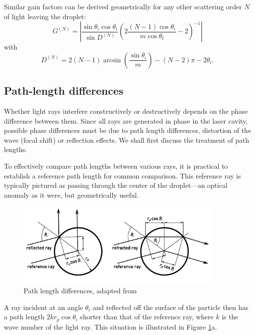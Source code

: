 \documentclass[11.5pt,oneside]{book}
\begin{document}
Similar gain factors can be derived geometrically for any other scattering order $N$ of light
leaving the droplet:
\begin{equation}
    \label{eq:gainfactor}
    G^{(N)} = \left| \frac{\sin \theta_i \cos \theta_i}{\sin D^{(N)}} \left(2
    \frac{(N-1)\cos \theta_i}{m \cos \theta_t} - 2\right)^{-1} \right|
\end{equation}
with
\begin{equation}
    D^{(N)} = 2(N-1) \arcsin \left(\frac{\sin \theta_i}{m}\right) - (N-2)\pi -
    2\theta_i.
\end{equation}

\subsection{Path-length differences}
Whether light rays interfere constructively or destructively depends on the
phase difference between them. Since all rays are generated in phase in the
laser cavity, possible phase differences must be due to path length differences,
distortion of the wave (focal shift) or reflection effects. We shall first
discuss the treatment of path lengths.

To effectively compare path lengths between various rays, it is practical to
establish a reference path length for common comparison. This reference ray is
typically pictured as passing through the center of the droplet---an optical
anomaly as it were, but geometrically useful.

\begin{figure}
\centering
\includegraphics[width=0.9\textwidth]{img/scattering/pathlength.pdf}
\caption{Path length differences, adapted from \citet{Albrecht03}}
\label{fig:pathlength}
\end{figure}

A ray incident at an angle $\theta_i$ and reflected off the surface of the
particle then has a path length $2kr_p \cos \theta_i$ shorter than that of the
reference ray, where $k$ is the wave number of the light ray. This situation is
illustrated in Figure \ref{fig:pathlength}a.
\end{document}
